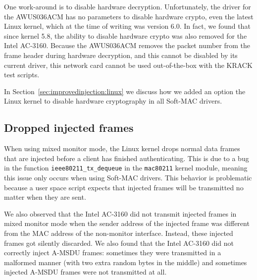 \documentclass[sigconf]{acmart}
\newcommand{\red}[1]{\textcolor{red}{#1}}
\begin{document}
One work-around is to disable hardware decryption.
Unfortunately, the driver for the AWUS036ACM has no parameters to disable hardware crypto, even the latest Linux kernel, which at the time of writing was version 6.0.
In fact, we found that since kernel 5.8, the ability to disable hardware crypto was also removed for the Intel AC-3160.
Because the AWUS036ACM removes the packet number from the frame header during hardware decryption, and this cannot be disabled by its current driver, this network card cannot be used out-of-the-box with the KRACK test scripts.

In Section~\ref{sec:improvedinjection:linux} we discuss how we added an option the Linux kernel to disable hardware cryptography in all Soft-MAC drivers.



\subsection{Dropped injected frames}

When using mixed monitor mode, the Linux kernel drops normal data frames that are injected before a client has finished authenticating.
This is due to a bug in the function \verb|ieee80211_tx_dequeue| in the \verb|mac80211| kernel module, meaning this issue only occurs when using Soft-MAC drivers.
This behavior is problematic because a user space script expects that injected frames will be transmitted no matter when they are sent.

We also observed that the Intel AC-3160 did not transmit injected frames in mixed monitor mode when the sender address of the injected frame was different from the MAC address of the non-monitor interface.
Instead, these injected frames got silently discarded.
We also found that the Intel AC-3160 did not correctly inject A-MSDU frames: sometimes they were transmitted in a malformed manner (with two extra random bytes in the middle) and sometimes injected A-MSDU frames were not transmitted at all.
\end{document}
